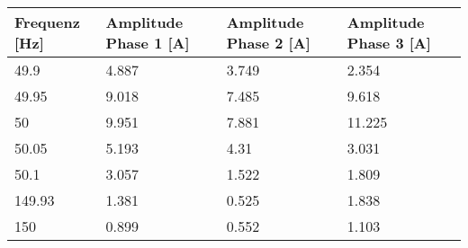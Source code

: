 \newpage
\begin{table}[ht]
	\centering
	\begin{tabular}{|l|l|l|l|}
		\hline
		Frequenz {[}Hz{]} & Amplitude Phase 1 {[}A{]}                                                           & Amplitude Phase 2 {[}A{]}                                                           & Amplitude Phase 3 {[}A{]}                                                           \\ \hline
		49.9              & 4.887                                                                               & 3.749                                                                               & 2.354                                                                               \\ \hline
		49.95             & 9.018                                                                               & 7.485                                                                               & 9.618                                                                               \\ \hline
		50                & 9.951                                                                               & 7.881                                                                               & 11.225                                                                              \\ \hline
		50.05             & 5.193                                                                               & 4.31                                                                                & 3.031                                                                               \\ \hline
		50.1              & 3.057                                                                               & 1.522                                                                               & 1.809                                                                               \\ \hline
		149.93            & 1.381                                                                               & 0.525                                                                               & 1.838                                                                               \\ \hline
		150               & 0.899                                                                               & 0.552                                                                               & 1.103                                                                               \\ \hline

\end{tabular}
\end{table}
